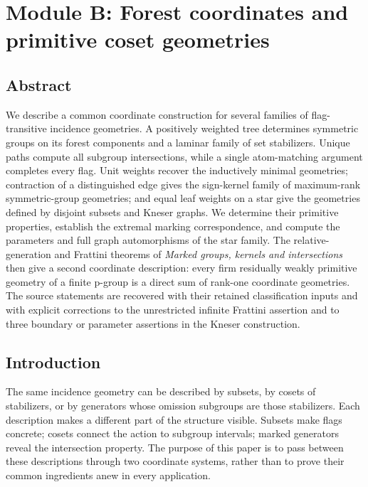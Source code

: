 \documentclass[
  11pt,
  a4paper,
]{article}
\author{}
\date{}
\begin{document}
\section{Module B: Forest coordinates and primitive coset
geometries}\label{module-b-forest-coordinates-and-primitive-coset-geometries}

\subsection{Abstract}\label{abstract}

We describe a common coordinate construction for several families of
flag-transitive incidence geometries. A positively weighted tree
determines symmetric groups on its forest components and a laminar
family of set stabilizers. Unique paths compute all subgroup
intersections, while a single atom-matching argument completes every
flag. Unit weights recover the inductively minimal geometries;
contraction of a distinguished edge gives the sign-kernel family of
maximum-rank symmetric-group geometries; and equal leaf weights on a
star give the geometries defined by disjoint subsets and Kneser graphs.
We determine their primitive properties, establish the extremal marking
correspondence, and compute the parameters and full graph automorphisms
of the star family. The relative-generation and Frattini theorems of
\emph{Marked groups, kernels and intersections} then give a second
coordinate description: every firm residually weakly primitive geometry
of a finite p-group is a direct sum of rank-one coordinate geometries.
The source statements are recovered with their retained classification
inputs and with explicit corrections to the unrestricted infinite
Frattini assertion and to three boundary or parameter assertions in the
Kneser construction.

\subsection{Introduction}\label{introduction}

The same incidence geometry can be described by subsets, by cosets of
stabilizers, or by generators whose omission subgroups are those
stabilizers. Each description makes a different part of the structure
visible. Subsets make flags concrete; cosets connect the action to
subgroup intervals; marked generators reveal the intersection property.
The purpose of this paper is to pass between these descriptions through
two coordinate systems, rather than to prove their common ingredients
anew in every application.
\end{document}

